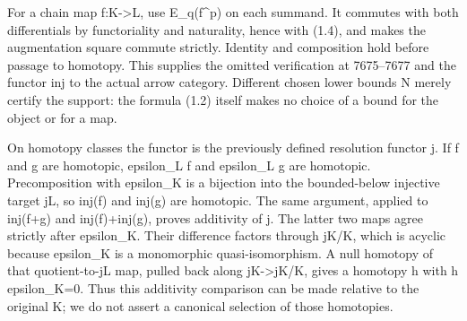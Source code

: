 \documentclass[11pt]{article}
\begin{document}
For a chain map f:\allowbreak{}K\allowbreak{}->L,\allowbreak{} use E\_\allowbreak{}q(f\textasciicircum{}p)\allowbreak{} on each summand. It commutes with both differentials by functoriality and naturality,\allowbreak{} hence with (1.4)\allowbreak{},\allowbreak{} and makes the augmentation square commute strictly. Identity and composition hold before passage to homotopy. This supplies the omitted verification at 7675–\allowbreak{}7677 and the functor inj to the actual arrow category. Different chosen lower bounds N merely certify the support:\allowbreak{} the formula (1.2)\allowbreak{} itself makes no choice of a bound for the object or for a map.

On homotopy classes the functor is the previously defined resolution functor j. If f and g are homotopic,\allowbreak{} epsilon\_\allowbreak{}L f and epsilon\_\allowbreak{}L g are homotopic. Precomposition with epsilon\_\allowbreak{}K is a bijection into the bounded-below injective target jL,\allowbreak{} so inj(f)\allowbreak{} and inj(g)\allowbreak{} are homotopic. The same argument,\allowbreak{} applied to inj(f\allowbreak{}+g)\allowbreak{} and inj(f)\allowbreak{}\allowbreak{}+inj(g)\allowbreak{},\allowbreak{} proves additivity of j. The latter two maps agree strictly after epsilon\_\allowbreak{}K. Their difference factors through jK/\allowbreak{}K,\allowbreak{} which is acyclic because epsilon\_\allowbreak{}K is a monomorphic quasi-isomorphism. A null homotopy of that quotient-to-jL map,\allowbreak{} pulled back along jK\allowbreak{}->jK/\allowbreak{}K,\allowbreak{} gives a homotopy h with h epsilon\_\allowbreak{}K\allowbreak{}=0. Thus this additivity comparison can be made relative to the original K; we do not assert a canonical selection of those homotopies.
\end{document}
